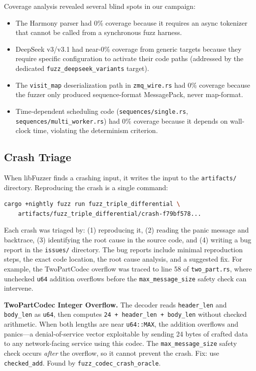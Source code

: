 Coverage analysis revealed several blind spots in our campaign:
\begin{itemize}
  \item The Harmony parser had 0\% coverage because it requires an async tokenizer that cannot be called from a synchronous fuzz harness.
  \item DeepSeek v3/v3.1 had near-0\% coverage from generic targets because they require specific configuration to activate their code paths (addressed by the dedicated \texttt{fuzz\_deepseek\_variants} target).
  \item The \texttt{visit\_map} deserialization path in \texttt{zmq\_wire.rs} had 0\% coverage because the fuzzer only produced sequence-format MessagePack, never map-format.
  \item Time-dependent scheduling code (\texttt{sequences/single.rs}, \texttt{sequences/multi\_worker.rs}) had 0\% coverage because it depends on wall-clock time, violating the determinism criterion.
\end{itemize}

\subsection{Crash Triage}

When libFuzzer finds a crashing input, it writes the input to the \texttt{artifacts/} directory. Reproducing the crash is a single command:

\begin{lstlisting}[language=bash,caption={Reproducing a crash from a saved artifact.}]
cargo +nightly fuzz run fuzz_triple_differential \
    artifacts/fuzz_triple_differential/crash-f79bf578...
\end{lstlisting}

Each crash was triaged by: (1) reproducing it, (2) reading the panic message and backtrace, (3) identifying the root cause in the source code, and (4) writing a bug report in the \texttt{issues/} directory. The bug reports include minimal reproduction steps, the exact code location, the root cause analysis, and a suggested fix. For example, the TwoPartCodec overflow was traced to line 58 of \texttt{two\_part.rs}, where unchecked \texttt{u64} addition overflows before the \texttt{max\_message\_size} safety check can intervene.

\begin{bugbox}
\textbf{TwoPartCodec Integer Overflow.} The decoder reads \texttt{header\_len} and \texttt{body\_len} as \texttt{u64}, then computes \texttt{24 + header\_len + body\_len} without checked arithmetic. When both lengths are near \texttt{u64::MAX}, the addition overflows and panics---a denial-of-service vector exploitable by sending 24 bytes of crafted data to any network-facing service using this codec. The \texttt{max\_message\_size} safety check occurs \emph{after} the overflow, so it cannot prevent the crash. Fix: use \texttt{checked\_add}. Found by \texttt{fuzz\_codec\_crash\_oracle}.
\end{bugbox}

